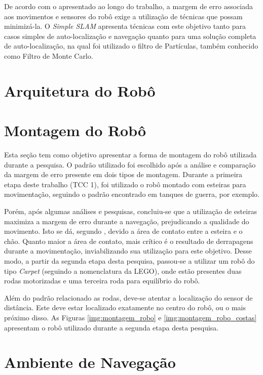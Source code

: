 	De acordo com o apresentado ao longo do trabalho, a margem de erro associada aos movimentos e sensores do robô exige a utilização de técnicas que possam minimizá-la. O \textit{Simple SLAM} apresenta técnicas com este objetivo tanto para casos simples de auto-localização e navegação quanto para uma solução completa de auto-localização, na qual foi utilizado o filtro de Partículas, também conhecido como Filtro de Monte Carlo.

\section{Arquitetura do Robô}


\section{Montagem do Robô}

	Esta seção tem como objetivo apresentar a forma de montagem do robô utilizada durante a pesquisa. O padrão utilizado foi escolhido após a análise e comparação da margem de erro presente em dois tipos de montagem. Durante a primeira etapa deste trabalho (TCC 1), foi utilizado o robô montado com esteiras para movimentação, seguindo o padrão encontrado em tanques de guerra, por exemplo.

	Porém, após algumas análises e pesquisas, concluiu-se que a utilização de esteiras maximiza a margem de erro durante a navegação, prejudicando a qualidade do movimento. Isto se dá, segundo \cite{legonxj}, devido a área de contato entre a esteira e o chão. Quanto maior a área de contato, mais crítico é o resultado de derrapagens durante a movimentação, inviabilizando sua utilização para este objetivo. Desse modo, a partir da segunda etapa desta pesquisa, passou-se a utilizar um robô do tipo \textit{Carpet} (seguindo a nomenclatura da LEGO), onde estão presentes duas rodas motorizadas e uma terceira roda para equilíbrio do robô.

	Além do padrão relacionado as rodas, deve-se atentar a localização do sensor de distância. Este deve estar localizado exatamente no centro do robô, ou o mais próximo disso. As Figuras \ref{img:montagem_robo}  e \ref{img:montagem_robo_costas} apresentam o robô utilizado durante a segunda etapa desta pesquisa.

\section{Ambiente de Navegação}

